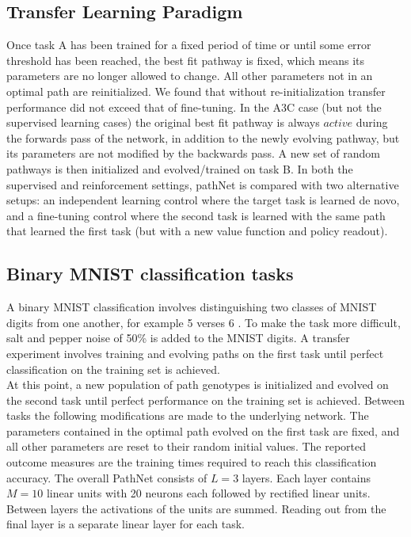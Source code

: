 \documentclass{sig-alternate-05-2015}
\begin{document}
\subsection{Transfer Learning Paradigm} 
Once task A has been trained for a fixed period of time or until some error threshold has been reached, the best fit pathway is fixed, which means its parameters are no longer allowed to change. All other parameters not in an optimal path are reinitialized. We found that without re-initialization transfer performance did not exceed that of fine-tuning. In the A3C case (but not the supervised learning cases) the original best fit pathway is always \(active\) during the forwards pass of the network, in addition to the newly evolving pathway, but its parameters are not modified by the backwards pass. A new set of random pathways is then initialized and evolved/trained on task B. In both the supervised and reinforcement settings, pathNet is compared with two alternative setups: an independent learning control where the target task is learned de novo, and a fine-tuning control where the second task is learned with the same path that learned the first task (but with a new value function and policy readout).  \\

\subsection{Binary MNIST classification tasks} 
A binary MNIST classification involves distinguishing two classes of MNIST digits from one another, for example 5 verses 6 \cite{lecun1998gradient}. To make the task more difficult, salt and pepper noise of 50\% is added to the MNIST digits. A transfer experiment involves training and evolving paths on the first task until perfect classification on the training set is achieved.\\

At this point, a new population of path genotypes is initialized and evolved on the second task until perfect performance on the training set is achieved. Between tasks the following modifications are made to the underlying network. The parameters contained in the optimal path evolved on the first task are fixed, and all other parameters are reset to their random initial values. The reported outcome measures are the training times required to reach this classification accuracy. The overall PathNet consists of \(L = 3\) layers. Each layer contains \(M = 10\) linear units with 20 neurons each followed by rectified linear units. Between layers the activations of the units are summed. Reading out from the final layer is a separate linear layer for each task.\\
\end{document}
